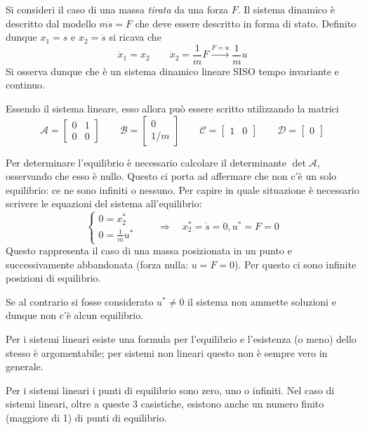  	
 	\begin{esempio}{}
 		Si consideri il caso di una massa \textit{tirata} da una forza $F$. Il sistema dinamico è descritto dal modello $m\ddot s = F$ che deve essere descritto in forma di stato. Definito dunque $x_1 = s$ e $x_2 = \dot s$ si ricava che
 		\[\dot x_1 = x_2 \qquad \dot x_2 = \frac 1 m F \xrightarrow{F=u} \frac 1 m u\]
 		Si osserva dunque che è un sistema dinamico lineare SISO tempo invariante e continuo. 
 		
 		Essendo il sistema lineare, esso allora può essere scritto utilizzando la matrici
 		\[\mathcal A = \begin{bmatrix}
 			0 & 1 \\ 0 & 0
 		\end{bmatrix} \qquad \mathcal B = \begin{bmatrix}
 			0 \\ 1/m
 		\end{bmatrix} \qquad \mathcal C = \begin{bmatrix}
 			1 & 0 
 		\end{bmatrix} \qquad \mathcal D = \begin{bmatrix}
 			0
 		\end{bmatrix}\]
 		
 		Per determinare l'equilibrio è necessario calcolare il determinante $\det \mathcal A$, osservando che esso è nullo. Questo ci porta ad affermare che non c'è un solo equilibrio: ce ne sono infiniti o nessuno. Per capire in quale situazione è necessario scrivere le equazioni del sistema all'equilibrio:
 		\[\begin{cases}
 		 	0 = x_2^* \\ 0 = \frac 1 m u^*
 		\end{cases} \qquad \Rightarrow \quad x_2^*=  \dot s = 0, u^* = F = 0\]
 		Questo rappresenta il caso di una massa posizionata in un punto e successivamente abbandonata (forza nulla: $u=F=0$). Per questo ci sono infinite posizioni di equilibrio.
 		
 		Se al contrario si fosse considerato $u^*\neq 0$ il sistema non ammette soluzioni e dunque non c'è alcun equilibrio.
 		
 	\end{esempio}
 
 	\begin{nota}
 		Per i sistemi lineari esiste una formula per l'equilibrio e l'esistenza (o meno) dello stesso è argomentabile; per sistemi non lineari questo non è sempre vero in generale.
 		
 		Per i sistemi lineari i punti di equilibrio sono zero, uno o infiniti. Nel caso di sistemi lineari, oltre a queste 3 casistiche, esistono anche un numero finito (maggiore di 1) di punti di equilibrio. 
 	\end{nota}
 	
